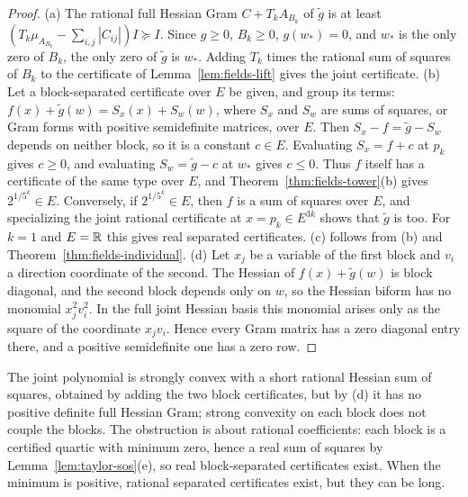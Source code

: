 \begin{proof}
(a) The rational full Hessian Gram $C+T_kA_{B_k}$ of $\tilde g$ is at least
$(T_k\mu_{A_{B_k}}-\sum_{i,j}|C_{ij}|)I\succeq I$. Since $g\ge0$, $B_k\ge0$,
$g(w_*)=0$, and $w_*$ is the only zero of $B_k$, the only zero of
$\tilde g$ is $w_*$. Adding $T_k$ times the rational sum of squares of $B_k$
to the certificate of Lemma~\ref{lem:fields-lift} gives the joint
certificate. (b) Let a block-separated certificate over $E$ be given, and
group its terms: $f(x)+\tilde g(w)=S_x(x)+S_w(w)$, where $S_x$ and $S_w$ are
sums of squares, or Gram forms with positive semidefinite matrices, over $E$.
Then $S_x-f=\tilde g-S_w$ depends on neither block, so it is a constant
$c\in E$. Evaluating $S_x=f+c$ at $p_k$ gives $c\ge0$, and evaluating
$S_w=\tilde g-c$ at $w_*$ gives $c\le0$. Thus $f$ itself has a certificate of
the same type over $E$, and Theorem~\ref{thm:fields-tower}(b) gives
$2^{1/5^k}\in E$. Conversely, if $2^{1/5^k}\in E$, then $f$ is a sum of squares
over $E$, and specializing the joint rational certificate at
$x=p_k\in E^{3k}$ shows that $\tilde g$ is too. For $k=1$ and $E=\mathbb R$ this gives
real separated certificates. (c) follows from (b) and
Theorem~\ref{thm:fields-individual}. (d) Let $x_j$ be a variable of the first
block and $v_i$ a direction coordinate of the second. The Hessian of
$f(x)+\tilde g(w)$ is block diagonal, and the second block depends only on
$w$, so the Hessian biform has no monomial $x_j^2v_i^2$. In the full joint
Hessian basis this monomial arises only as the square of the coordinate
$x_jv_i$. Hence every Gram matrix has a zero diagonal entry there, and a
positive semidefinite one has a zero row.
\end{proof}

The joint polynomial is strongly convex with a short rational Hessian sum of
squares, obtained by adding the two block certificates, but by (d) it has no
positive definite full Hessian Gram; strong convexity on each block does not
couple the blocks. The obstruction is about rational coefficients: each
block is a certified quartic with minimum zero, hence a real sum of squares
by Lemma~\ref{lem:taylor-sos}(e), so real block-separated certificates exist.
When the minimum is positive, rational separated certificates exist, but
they can be long.

